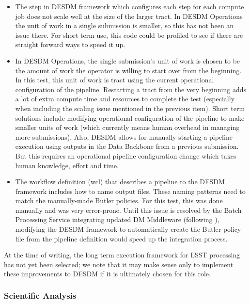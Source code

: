 \documentclass[DM,STR,toc]{lsstdoc}
\begin{document}
\begin{itemize}
  \item{
    The step in DESDM framework which configures each step for each compute job does not scale well at the size of the larger tract.
    In DESDM Operations the unit of work in a single submission is smaller, so this has not been an issue there.
    For short term use, this code could be profiled to see if there are straight forward ways to speed it up.
  }

  \item{
    In DESDM Operations, the single submission's unit of work is chosen to be the amount of work the operator is willing to start over from the beginning.
    In this test, this unit of work is tract using the current operational configuration of the pipeline.
    Restarting a tract from the very beginning adds a lot of extra compute time and resources to complete the test (especially when including the scaling issue
mentioned in the previous item).
    Short term solutions include modifying operational configuration of the pipeline to make smaller units of work (which currently means human overhead in managing more submissions).
    Also, DESDM allows for manually starting a pipeline execution using outputs in the Data Backbone from a previous submission.
    But this requires an operational pipeline configuration change which takes human knowledge, effort and time.
  }

  \item{
    The workflow definition (wcl) that describes a pipeline to the DESDM framework includes how to name output files.
    These naming patterns need to match the manually-made Butler policies.
    For this test, this was done manually and was very error-prone.
    Until this issue is resolved by the Batch Processing Service integrating
    updated DM Middleware (following ), modifying the DESDM framework to automatically create the Butler policy file from the pipeline definition would speed up the integration process.
  }

\end{itemize}

At the time of writing, the long term execution framework for LSST processing has not yet been selected; we note that it may make sense only to implement these improvements to DESDM if it is ultimately chosen for this role.

\subsubsection{Scientific Analysis}
\end{document}

